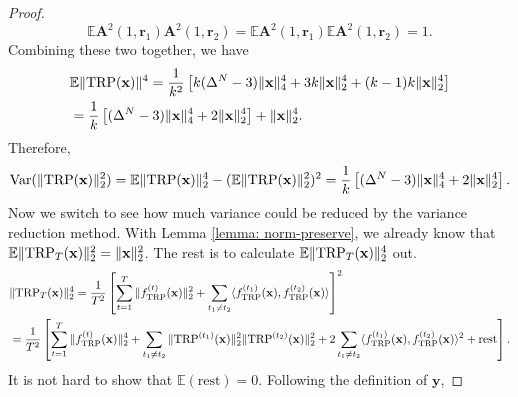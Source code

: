 \begin{proof}
\[
\mathbb{E} \mathbf{A}^2(1,\mathbf{r}_1)\mathbf{A}^2(1,\mathbf{r}_2) = \mathbb{E} \mathbf{A}^2(1,\mathbf{r}_1) \mathbb{E}  \mathbf{A}^2(1,\mathbf{r}_2)  = 1.
\]
Combining these two together, we have 
\begin{equation}
\begin{aligned}
&\mathbb{E}\|\textup{TRP}(\mathbf{x})\|^4 = \frac{1}{k^2}\left[k(\Delta^N-3)\|\mathbf{x}\|_4^4 +3k\|\mathbf{x}\|_2^4  +(k-1)k \|\mathbf{x}\|_2^4\right]\\
& =  \frac{1}{k}\left[(\Delta^N-3)\|\mathbf{x}\|_4^4 +2\|\mathbf{x}\|_2^4\right]+\|\mathbf{x}\|_2^4.  \nonumber 
\end{aligned}
\end{equation}
Therefore, 
\[
\textrm{Var}(\|\textup{TRP}(\mathbf{x})\|^2_2) = \mathbb{E}\|\textup{TRP}(\mathbf{x})\|^4_2 -  (\mathbb{E}\|\textup{TRP}(\mathbf{x})\|^2_2)^2 = \frac{1}{k}\left[(\Delta^N-3)\|\mathbf{x}\|_4^4 +2\|\mathbf{x}\|_2^4\right].
\]
Now we switch to see how much variance could be reduced by the variance reduction method. With Lemma \ref{lemma: norm-preserve}, we already know that $\mathbb{E} \|\textup{TRP}_T(\mathbf{x})\|^2_2= \|\mathbf{x}\|_2^2$. The rest is to calculate $\mathbb{E} \|\textup{TRP}_T(\mathbf{x})\|^4_2$ out.
\begin{equation}
\begin{aligned}
&\|\textup{TRP}_T(\mathbf{x})\|^4_2 = \frac{1}{T^2}\left[\sum_{t=1}^T \|f^{(t)}_{\text{TRP}}(\mathbf{x})\|^2_2+\sum_{t_1 \neq t_2} \langle f^{(t_1)}_{\text{TRP}}(\mathbf{x}), f^{(t_2)}_{\text{TRP}}(\mathbf{x}) \rangle \right]^2\\
&= \frac{1}{T^2} \left[ \sum_{t=1}^T \|f^{(t)}_{\text{TRP}}(\mathbf{x})\|^4_2+\sum_{t_1\neq t_2}\|\textup{TRP}^{(t_1)}(\mathbf{x})\|^2_2\|\textup{TRP}^{(t_2)}(\mathbf{x})\|^2_2 +2\sum_{t_1\neq t_2}\langle f^{(t_1)}_{\text{TRP}}(\mathbf{x}), f^{(t_2)}_{\text{TRP}}(\mathbf{x}) \rangle^2 +\text{rest} \right].\nonumber 
\end{aligned}
\end{equation}
It is not hard to show that $\mathbb{E}(\text{rest}) = 0$. Following the definition of $\mathbf{y}$, 


\end{proof}
